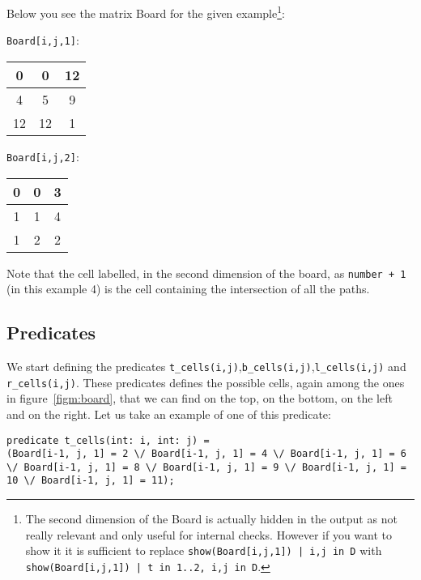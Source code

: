 Below you see the matrix Board for the given example\footnote{The second dimension of the Board is actually hidden in the output as not really relevant and only useful for internal checks. However if you want to show it it is sufficient to replace \texttt{show(Board[i,j,1]) | i,j in D} with \texttt{show(Board[i,j,1]) | t in 1..2, i,j in D}.}:


\texttt{Board[i,j,1]}:
\begin{center}
    \begin{tabular}{ |c|c|c| } 
     \hline
     0 &0 &12 \\
     \hline
4 &5 &9 \\
\hline
12 &12 &1 \\
     \hline
    \end{tabular}
    \end{center}

\texttt{Board[i,j,2]}:
    \begin{center}
    \begin{tabular}{ |c|c|c| } 
        \hline
        0 &0 &3 \\
        \hline
   1 &1 &4 \\
   \hline
   1 &2 &2 \\
        \hline
       \end{tabular}
    \end{center}
Note that the cell labelled, in the second dimension of the board, as \texttt{number + 1} (in this example 4) is the cell containing the intersection of all the paths.

\subsection{Predicates}\label{subsec:predicates}
We start defining the predicates \texttt{t_cells(i,j)},\texttt{b_cells(i,j)},\texttt{l_cells(i,j)} and \texttt{r_cells(i,j)}. These predicates defines the possible cells, again among the ones in figure~\ref{figm:board}, that we can find on the top, on the bottom, on the left and on the right.
Let us take an example of one of this predicate:
\begin{verbatim}
predicate t_cells(int: i, int: j) =
(Board[i-1, j, 1] = 2 \/ Board[i-1, j, 1] = 4 \/ Board[i-1, j, 1] = 6 \/ Board[i-1, j, 1] = 8 \/ Board[i-1, j, 1] = 9 \/ Board[i-1, j, 1] = 10 \/ Board[i-1, j, 1] = 11);
\end{verbatim}

